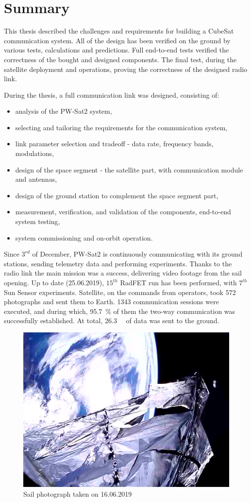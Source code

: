 \section{Summary}
This thesis described the challenges and requirements for building a CubeSat communication system. All of the design has been verified on the ground by various tests, calculations and predictions. Full end-to-end tests verified the correctness of the bought and designed components. The final test, during the satellite deployment and operations, proving the correctness of the designed radio link.

During the thesis, a full communication link was designed, consisting of:
\begin{itemize}
    \item analysis of the PW-Sat2 system,
    \item selecting and tailoring the requirements for the communication system,
    \item link parameter selection and tradeoff - data rate, frequency bands, modulations,
    \item design of the space segment - the satellite part, with communication module and antennas,
    \item design of the ground station to complement the space segment part,
    \item measurement, verification, and validation of the components, end-to-end system testing,
    \item system commissioning and on-orbit operation.
\end{itemize}


Since $3^{rd}$ of December, PW-Sat2 is continuously communicating with its ground stations, sending telemetry data and performing experiments. Thanks to the radio link the main mission was a success, delivering video footage from the sail opening. Up to date (25.06.2019), $15^{th}$ RadFET run has been performed, with $7^{th}$ Sun Sensor experiments. Satellite, on the commands from operators, took \si{572} photographs and sent them to Earth. \si{1343} communication sessions were executed, and during which, \SI{95.7}{\percent} of them the two-way communication was successfully established. At total, \SI{26.3}{\mega\byte} of data was sent to the ground.

\begin{figure}[H]
    \centering
    \includegraphics[width=0.58\paperwidth]{img/9/sail_photo.jpg}
    \caption{Sail photograph taken on 16.06.2019}
    \label{sail_photo}
\end{figure}